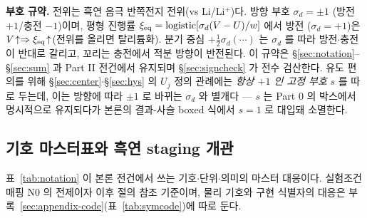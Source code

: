 \textbf{부호 규약.} 전위는 흑연 음극 반쪽전지 전위(vs Li/Li$^+$)다. 방향 부호 $\sigma_d=\pm1$
(방전 $+1$/충전 $-1$)이며, 평형 진행률 $\xi_{\mathrm{eq}}=\mathrm{logistic}[\sigma_d(V-U)/w]$ 에서 방전
($\sigma_d=+1$)은 $V\!\uparrow\Rightarrow\xi_{\mathrm{eq}}\!\uparrow$(전위를 올리면 탈리튬화). 분기 중심 $+\tfrac12\sigma_d(\cdots)$
는 $\sigma_d$ 를 따라 방전$\cdot$충전이 반대로 갈리고, 꼬리는 충전에서 적분 방향이 반전된다. 이 규약은 \S\ref{sec:notation}--\S\ref{sec:sum}
과 Part II 전건에서 유지되며 \S\ref{sec:signcheck} 가 전수 검산한다. 유도 편의를 위해 \S\ref{sec:center}$\cdot$\S\ref{sec:hys}
의 $U_j$ 정의 관례에는 \emph{항상 $+1$ 인 고정 부호} $s$ 를 따로 두는데, 이는 방향에 따라 $\pm1$ 로 바뀌는 $\sigma_d$ 와
별개다 --- $s$ 는 Part 0 의 박스에서 명시적으로 유지되다가 본론의 결과-사슬 boxed 식에서 $s{=}1$ 로 대입돼 소멸한다.

\subsection{기호 마스터표와 흑연 staging 개관}\label{sec:notation-table}
표~\ref{tab:notation} 이 본론 전건에서 쓰는 기호$\cdot$단위$\cdot$의미의 마스터 대응이다. 실험조건 매핑 $\mathrm N0$
의 전제이자 이후 절의 참조 기준이며, 물리 기호와 구현 식별자의 대응은 부록~\ref{sec:appendix-code}(표~\ref{tab:symcode})에 따로 둔다.

